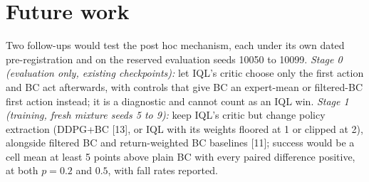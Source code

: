 \documentclass{article}
\begin{document}
\section{Future work}
Two follow-ups would test the post hoc mechanism, each under its own dated pre-registration and on the reserved evaluation seeds 10050 to 10099. \emph{Stage 0 (evaluation only, existing checkpoints):} let IQL's critic choose only the first action and BC act afterwards, with controls that give BC an expert-mean or filtered-BC first action instead; it is a diagnostic and cannot count as an IQL win. \emph{Stage 1 (training, fresh mixture seeds 5 to 9):} keep IQL's critic but change policy extraction (DDPG+BC [13], or IQL with its weights floored at 1 or clipped at 2), alongside filtered BC and return-weighted BC baselines [11]; success would be a cell mean at least 5 points above plain BC with every paired difference positive, at both $p=0.2$ and $0.5$, with fall rates reported.
\end{document}
